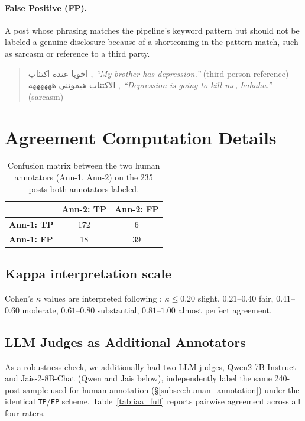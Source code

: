 \documentclass[letterpaper]{article} %
\begin{document}
\paragraph{False Positive (FP).} A post whose phrasing matches the
pipeline's keyword pattern but should not be labeled a genuine
disclosure because of a shortcoming in the pattern match, such as
sarcasm or reference to a third party.

\begin{quote}
\foreignlanguage{arabic}{اخويا عنده اكتئاب} ,  \textit{``My brother has depression.''} (third-person reference)\\
\foreignlanguage{arabic}{الاكتئاب هيموتني ههههههه} ,  \textit{``Depression is going to kill me, hahaha.''} (sarcasm)
\end{quote}

\section{Agreement Computation Details}
\label{app:agreement_details}

\begin{table}[h]
\centering
\small
\begin{tabular}{lcc}
\toprule
 & \textbf{Ann-2: TP} & \textbf{Ann-2: FP} \\
\midrule
\textbf{Ann-1: TP} & 172 & 6 \\
\textbf{Ann-1: FP} & 18 & 39 \\
\bottomrule
\end{tabular}
\caption{Confusion matrix between the two human annotators (Ann-1,
Ann-2) on the 235 posts both annotators labeled.}
\label{tab:iaa_confusion}
\end{table}


\subsection*{Kappa interpretation scale}

Cohen's $\kappa$ values are interpreted following
\citet{landis1977measurement}: $\kappa \leq 0.20$ slight,
$0.21$--$0.40$ fair, $0.41$--$0.60$ moderate, $0.61$--$0.80$
substantial, $0.81$--$1.00$ almost perfect agreement.

\subsection*{LLM Judges as Additional Annotators}
\label{app:llm_fp_estimate}

As a robustness check, we additionally had two LLM judges, Qwen2-7B-Instruct \citep{yang-etal-2024-qwen2} and Jais-2-8B-Chat \citep{anwar-etal-2025-jais2} (Qwen and Jais below), independently label the same 240-post sample used for human
annotation (\S\ref{subsec:human_annotation}) under the identical
\texttt{TP}/\texttt{FP} scheme. Table~\ref{tab:iaa_full} reports
pairwise agreement across all four raters.
\end{document}
